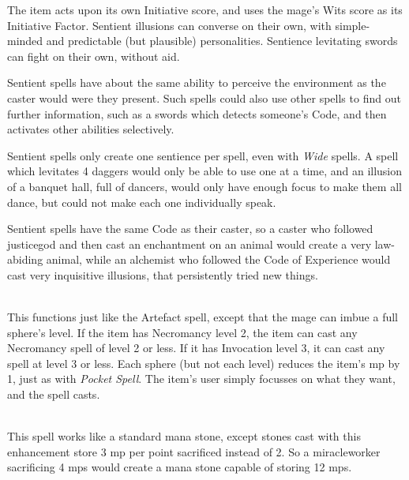 \begin{multicols}{2}
The item acts upon its own Initiative score, and uses the mage's Wits score as its Initiative Factor.
Sentient illusions can converse on their own, with simple-minded and predictable (but plausible) personalities.
Sentience levitating swords can fight on their own, without aid.

Sentient spells have about the same ability to perceive the environment as the caster would were they present.
Such spells could also use other spells to find out further information, such as a swords which detects someone's Code, and then activates other abilities selectively.

Sentient spells only create one sentience per spell, even with \textit{Wide} spells.
A spell which levitates 4 daggers would only be able to use one at a time, and an illusion of a banquet hall, full of dancers, would only have enough focus to make them all dance, but could not make each one individually speak.

Sentient spells have the same Code as their caster, so a caster who followed \gls{justicegod} and then cast an enchantment on an animal would create a very law-abiding animal, while an alchemist who followed the Code of Experience would cast very inquisitive illusions, that persistently tried new things.

\spelllevel

\\
This functions just like the Artefact spell, except that the mage can imbue a full sphere's level.
If the item has Necromancy level 2, the item can cast any Necromancy spell of level 2 or less.
If it has Invocation level 3, it can cast any spell at level 3 or less.
Each sphere (but not each level) reduces the item's \gls{mp} by 1, just as with \textit{Pocket Spell}.
The item's user simply focusses on what they want, and the spell casts.

\spelllevel

\\
This spell works like a standard mana stone, except stones cast with this enhancement store 3 \gls{mp} per point sacrificed instead of 2.
So a \gls{miracleworker} sacrificing 4 \glspl{mp} would create a mana stone capable of storing 12 \glspl{mp}.

\stopcontents[magic]

\end{multicols}

